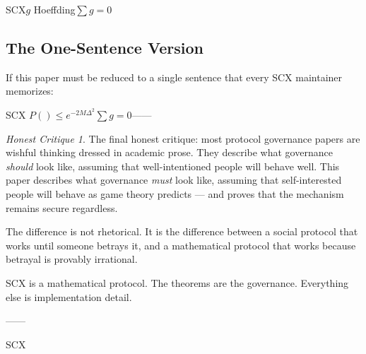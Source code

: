 \documentclass[12pt,a4paper]{article}
\theoremstyle{remark}
\newtheorem{honesthit}{Honest Critique}[section]
\newenvironment{hitbox}{%
  \begin{center}
  \color{red}
  \begin{minipage}{0.92\textwidth}
  \begin{honesthit}
}{%
  \end{honesthit}
  \end{minipage}
  \end{center}
}
\begin{document}
\noindent\textbf{}
SCX$g$
Hoeffding$\sum g = 0$

\subsection{The One-Sentence Version}

If this paper must be reduced to a single sentence that every SCX maintainer
memorizes:

\begin{center}
\end{center}

\noindent\textbf{}
SCX
$P(\text{}) \leq e^{-2M\Delta^2}$$\sum g = 0$——


\vspace{16pt}

\begin{hitbox}
The final honest critique: most protocol governance papers are wishful thinking
dressed in academic prose. They describe what governance \textit{should} look
like, assuming that well-intentioned people will behave well. This paper
describes what governance \textit{must} look like, assuming that self-interested
people will behave as game theory predicts — and proves that the mechanism
remains secure regardless.

The difference is not rhetorical. It is the difference between a social protocol
that works until someone betrays it, and a mathematical protocol that works
because betrayal is provably irrational.

SCX is a mathematical protocol. The theorems are the governance. Everything else
is implementation detail.

\begin{center}
\small\textbf{}


——




SCX
\end{center}
\end{hitbox}

\newpage

\appendix
\end{document}
